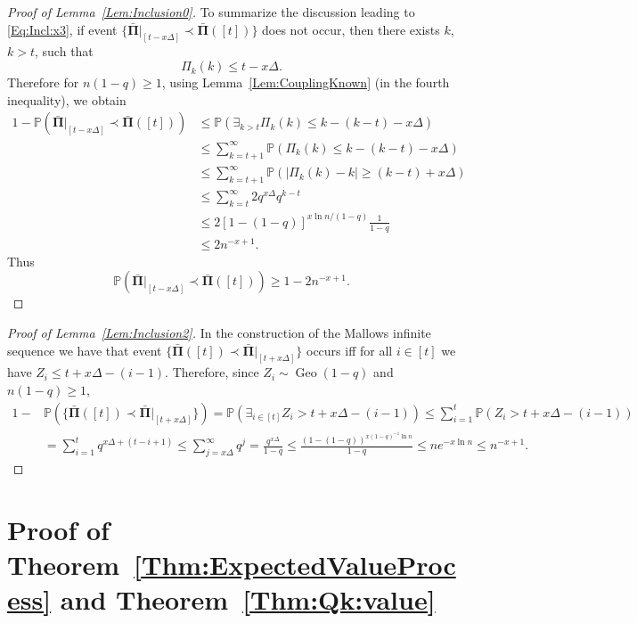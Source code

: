 \documentclass[letterpaper,11pt]{article}
\theoremstyle{definition}
\theoremstyle{remark}
\renewcommand{\le}{\leqslant}
\renewcommand{\ge}{\geqslant}
\newcommand{\Pra}[1]{\mathbb{P}\left(#1\right)}
\newcommand{\barPi}{\bar {\mathbf \Pi}}
\newcommand{\subseq}{\prec}
\begin{document}
\begin{proof}[Proof of Lemma~\ref{Lem:Inclusion0}]
	To summarize the discussion leading to \eqref{Eq:Incl:x3}, if event $\{\barPi|_{[t-x\Delta]}\subseq \barPi([t])\}$ does not occur, then there exists $k$, $k>t$, such that
	\[	\varPi_k(k)\le t- x\Delta.
	\]	
	Therefore for $n(1-q)\ge 1$, using Lemma~\ref{Lem:CouplingKnown} (in the fourth inequality), we obtain
	\begin{align*}
		1-\Pra{\barPi|_{[t-x\Delta]}\subseq \barPi([t])}
		&\le \Pra{\exists_{k > t}\varPi_k(k)\le k - (k-t) - x\Delta}\\
		&\le \sum_{k=t+1}^{\infty}\Pra{\varPi_k(k)\le k - (k-t) - x\Delta}\\
		&\le \sum_{k=t+1}^{\infty}\Pra{|\varPi_k(k)-k|\ge (k-t) + x\Delta}\\
		&\le \sum_{k=t}^{\infty} 2q^{x\Delta}q^{k-t}\\
		&\le 2[1-(1-q)]^{x\ln n/(1-q)}\frac{1}{1-q}\\
		&\le 2n^{-x+1}.
	\end{align*}
	Thus
	\[
	\Pra{\barPi|_{[t-x\Delta]}\subseq \barPi([t])}\ge 1-2n^{-x+1}.
	\]
\end{proof}


\begin{proof}[Proof of Lemma~\ref{Lem:Inclusion2}] 
	In the construction of the Mallows infinite sequence we have that event $\{\barPi([t])\subseq \barPi|_{[t+x\Delta]}\}$ occurs iff for all $i\in [t]$ we have $Z_i\le t+x\Delta-(i-1)$. Therefore, since $Z_i\sim \operatorname{Geo}(1-q)$ and $n(1-q)\ge 1$,
	\begin{align*}
		1-&\Pra{\{\barPi([t])\subseq \barPi|_{[t+x\Delta]}\}}
		=\Pra{\exists_{i\in [t]}Z_i > t+x\Delta-(i-1)}\le \sum_{i=1}^{t}\Pra{Z_i > t+x\Delta-(i-1)}\\
		&= \sum_{i=1}^{t}q^{x\Delta+(t-i+1)}
		\le \sum_{j=x\Delta}^{\infty} q^j=\frac{q^{x\Delta}}{1-q}
		\le \frac{(1-(1-q))^{x(1-q)^{-1}\ln n}}{1-q}
		\le ne^{-x\ln n}\le n^{-x+1}. 
	\end{align*}
\end{proof}
















\section{Proof of Theorem~\ref{Thm:ExpectedValueProcess} and Theorem~\ref{Thm:Qk:value}}\label{Sec:Proof:Infinite}
\end{document}
